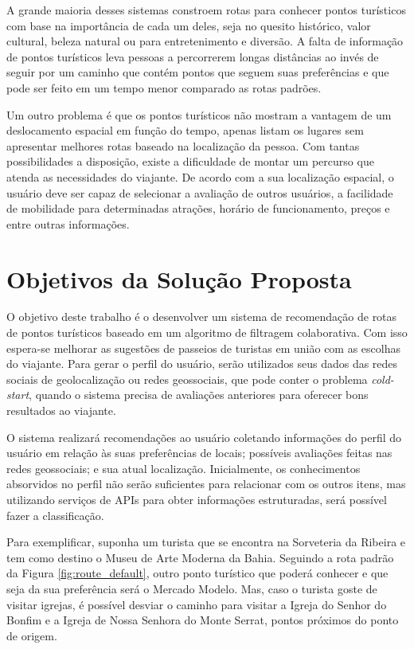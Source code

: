 A grande maioria desses sistemas constroem rotas para conhecer pontos turísticos com base na importância de cada um deles, seja no quesito histórico, valor cultural, beleza natural ou para entretenimento e diversão. A falta de informação de pontos turísticos leva pessoas a percorrerem longas distâncias ao invés de seguir por um caminho que contém pontos que seguem suas preferências e que pode ser feito em um tempo menor comparado as rotas padrões.

Um outro problema é que os pontos turísticos não mostram a vantagem de um deslocamento espacial em função do tempo, apenas listam os lugares sem apresentar melhores rotas baseado na localização da pessoa. Com tantas possibilidades a disposição, existe a dificuldade de montar um percurso que atenda as necessidades do viajante. De acordo com a sua localização espacial, o usuário deve ser capaz de selecionar a avaliação de outros usuários, a facilidade de mobilidade para determinadas atrações, horário de funcionamento, preços e entre outras informações.

\section{Objetivos da Solução Proposta}
\label{objectiveIntroduction}

O objetivo deste trabalho é o desenvolver um sistema de recomendação de rotas de pontos turísticos baseado em um algoritmo de filtragem colaborativa. Com isso espera-se melhorar as sugestões de passeios de turistas em união com as escolhas do viajante. Para gerar o perfil do usuário, serão utilizados seus dados das redes sociais de geolocalização ou redes geossociais, que pode conter o problema \textit{cold-start}, quando o sistema precisa de avaliações anteriores para oferecer bons resultados ao viajante.

O sistema realizará recomendações ao usuário coletando informações do perfil do usuário em relação às suas preferências de locais; possíveis avaliações feitas nas redes geossociais; e sua atual localização. Inicialmente, os conhecimentos absorvidos no perfil não serão suficientes para relacionar com os outros itens, mas utilizando serviços de APIs para obter informações estruturadas, será possível fazer a classificação.

Para exemplificar, suponha um turista que se encontra na Sorveteria da Ribeira e tem como destino o Museu de Arte Moderna da Bahia. Seguindo a rota padrão da Figura \ref{fig:route_default}, outro ponto turístico que poderá conhecer e que seja da sua preferência será o Mercado Modelo. Mas, caso o turista goste de visitar igrejas, é possível desviar o caminho para visitar a Igreja do Senhor do Bonfim e a Igreja de Nossa Senhora do Monte Serrat, pontos próximos do ponto de origem.

